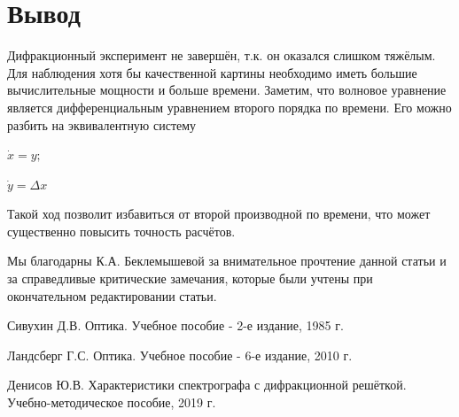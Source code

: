 \documentclass[
11pt,%
tightenlines,%
twoside,%
onecolumn,%
nofloats,%
nobibnotes,%
nofootinbib,%
superscriptaddress,%
noshowpacs,%
centertags]%
{revtex4}
\begin{document}
\section{Вывод}
Дифракционный эксперимент не завершён, т.к. он оказался слишком тяжёлым. Для наблюдения хотя бы 
качественной картины необходимо иметь большие вычислительные мощности и больше времени. 
Заметим, что волновое уравнение является дифференциальным уравнением второго порядка по времени.
Его можно разбить на эквивалентную систему
\begin{center}
    $\dot{x} = y;$
\end{center}
\begin{center}
    $\dot{y} = \Delta x$
\end{center}
Такой ход позволит избавиться от второй производной по времени, что может существенно повысить точность
расчётов.

\begin{acknowledgments}
    Мы благодарны К.А. Беклемышевой за внимательное прочтение данной статьи и за справедливые критические
    замечания, которые были учтены при окончательном редактировании статьи.
\end{acknowledgments}


\begin{thebibliography}{99}
    Сивухин Д.В. Оптика. Учебное пособие - 2-е издание, 1985 г.

    Ландсберг Г.С. Оптика. Учебное пособие - 6-е издание, 2010 г.

    Денисов Ю.В. Характеристики спектрографа с дифракционной решёткой. Учебно-методическое пособие, 2019 г.
    
\end{thebibliography}
\end{document}
